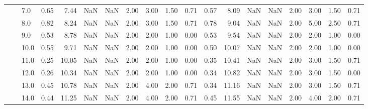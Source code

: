 \begin{tabular}{lllrrrrrrrrrrrrrrrr}
       &     & 7.0  &      0.65 &       7.44 &               NaN &                NaN & 2.00 &   3.00 &             1.50 &                         0.71 &      0.57 &       8.09 &               NaN &                NaN & 2.00 &   3.00 &             1.50 &                         0.71 \\
       &     & 8.0  &      0.82 &       8.24 &               NaN &                NaN & 2.00 &   3.00 &             1.50 &                         0.71 &      0.78 &       9.04 &               NaN &                NaN & 2.00 &   5.00 &             2.50 &                         0.71 \\
       &     & 9.0  &      0.53 &       8.78 &               NaN &                NaN & 2.00 &   2.00 &             1.00 &                         0.00 &      0.53 &       9.54 &               NaN &                NaN & 2.00 &   2.00 &             1.00 &                         0.00 \\
       &     & 10.0 &      0.55 &       9.71 &               NaN &                NaN & 2.00 &   2.00 &             1.00 &                         0.00 &      0.50 &      10.07 &               NaN &                NaN & 2.00 &   2.00 &             1.00 &                         0.00 \\
       &     & 11.0 &      0.25 &      10.05 &               NaN &                NaN & 2.00 &   2.00 &             1.00 &                         0.00 &      0.35 &      10.41 &               NaN &                NaN & 2.00 &   3.00 &             1.50 &                         0.71 \\
       &     & 12.0 &      0.26 &      10.34 &               NaN &                NaN & 2.00 &   2.00 &             1.00 &                         0.00 &      0.34 &      10.82 &               NaN &                NaN & 2.00 &   3.00 &             1.50 &                         0.00 \\
       &     & 13.0 &      0.45 &      10.78 &               NaN &                NaN & 2.00 &   4.00 &             2.00 &                         0.71 &      0.34 &      11.16 &               NaN &                NaN & 2.00 &   3.00 &             1.50 &                         0.71 \\
       &     & 14.0 &      0.44 &      11.25 &               NaN &                NaN & 2.00 &   4.00 &             2.00 &                         0.71 &      0.45 &      11.55 &               NaN &                NaN & 2.00 &   4.00 &             2.00 &                         0.71 \\

\end{tabular}
